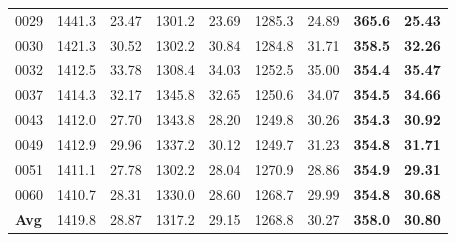 \documentclass[conference, a4paper]{IEEEtran}
\begin{document}
\begin{table}[t]
\begin{tabular}{l rrrr rrrr}
        0029           & 1441.3                           & 23.47                                    & 1301.2                                                  & 23.69                                                 & 1285.3  & 24.89 & \textbf{365.6} & \textbf{25.43} \\
        0030           & 1421.3                           & 30.52                                    & 1302.2                                                  & 30.84                                                 & 1284.8  & 31.71 & \textbf{358.5} & \textbf{32.26} \\
        0032           & 1412.5                           & 33.78                                    & 1308.4                                                  & 34.03                                                 & 1252.5  & 35.00 & \textbf{354.4} & \textbf{35.47} \\
        0037           & 1414.3                           & 32.17                                    & 1345.8                                                  & 32.65                                                 & 1250.6  & 34.07 & \textbf{354.5} & \textbf{34.66} \\
        0043           & 1412.0                           & 27.70                                    & 1343.8                                                  & 28.20                                                 & 1249.8  & 30.26 & \textbf{354.3} & \textbf{30.92} \\
        0049           & 1412.9                           & 29.96                                    & 1337.2                                                  & 30.12                                                 & 1249.7  & 31.23 & \textbf{354.8} & \textbf{31.71} \\
        0051           & 1411.1                           & 27.78                                    & 1302.2                                                  & 28.04                                                 & 1270.9  & 28.86 & \textbf{354.9} & \textbf{29.31} \\
        0060           & 1410.7                           & 28.31                                    & 1330.0                                                  & 28.60                                                 & 1268.7  & 29.99 & \textbf{354.8} & \textbf{30.68} \\
        \midrule
        \textbf{Avg}   & 1419.8                           & 28.87                                    & 1317.2                                                  & 29.15                                                 & 1268.8  & 30.27 & \textbf{358.0} & \textbf{30.80} \\
        \bottomrule
    \end{tabular}
\end{table}
\end{document}

